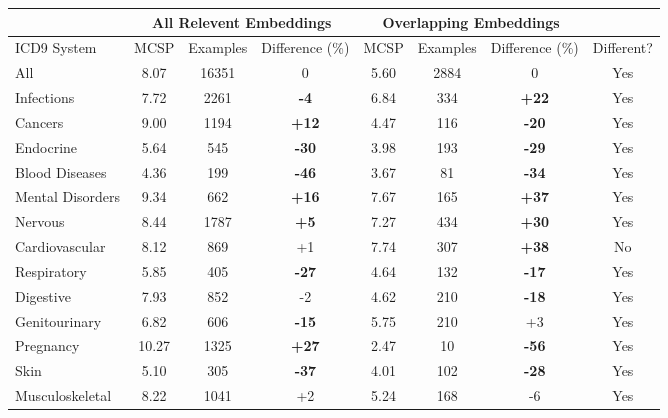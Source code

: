 \documentclass[10pt]{article}
\def\blu#1{{\textbf{\color{blu}#1}}}
\def\ora#1{{\textbf{\color{ora}#1}}}
\begin{document}
\begin{table*}[h]
	\label{tab:onlybeamonlymcsp}
	\begin{tabular}{l|c|c|c|c|c|c|c}
		& \multicolumn{3}{c|}{All Relevent Embeddings} & \multicolumn{3}{c|}{Overlapping Embeddings} &            \\
		\hline
		ICD9 System          & MCSP  & Examples & Difference (\%) & MCSP & Examples & Difference (\%) & Different? \\
		\hline
		All                  & 8.07  & 16351    & 0               & 5.60 & 2884     & 0               & Yes        \\
		Infections           & 7.72  & 2261     & \blu{-4}       & 6.84 & 334      & \ora{+22}        & Yes        \\
		Cancers              & 9.00  & 1194     & \ora{+12}        & 4.47 & 116      & \blu{-20}       & Yes        \\
		Endocrine            & 5.64  & 545      & \blu{-30}       & 3.98 & 193      & \blu{-29}       & Yes        \\
		Blood Diseases       & 4.36  & 199      & \blu{-46}       & 3.67 & 81       & \blu{-34}       & Yes        \\
		Mental Disorders     & 9.34  & 662      & \ora{+16}        & 7.67 & 165      & \ora{+37}        & Yes        \\
		Nervous              & 8.44  & 1787     & \ora{+5}         & 7.27 & 434      & \ora{+30}        & Yes        \\
		Cardiovascular       & 8.12  & 869      & +1               & 7.74 & 307      & \ora{+38}        & No         \\
		Respiratory          & 5.85  & 405      & \blu{-27}       & 4.64 & 132      & \blu{-17}       & Yes        \\
		Digestive            & 7.93  & 852      & -2              & 4.62 & 210      & \blu{-18}       & Yes        \\
		Genitourinary        & 6.82  & 606      & \blu{-15}       & 5.75 & 210      & +3               & Yes        \\
		Pregnancy            & 10.27 & 1325     & \ora{+27}        & 2.47 & 10       & \blu{-56}       & Yes        \\
		Skin                 & 5.10  & 305      & \blu{-37}       & 4.01 & 102      & \blu{-28}       & Yes        \\
		Musculoskeletal        & 8.22  & 1041     & +2               & 5.24 & 168      & -6              & Yes        \\

\end{tabular}
\end{table*}
\end{document}
